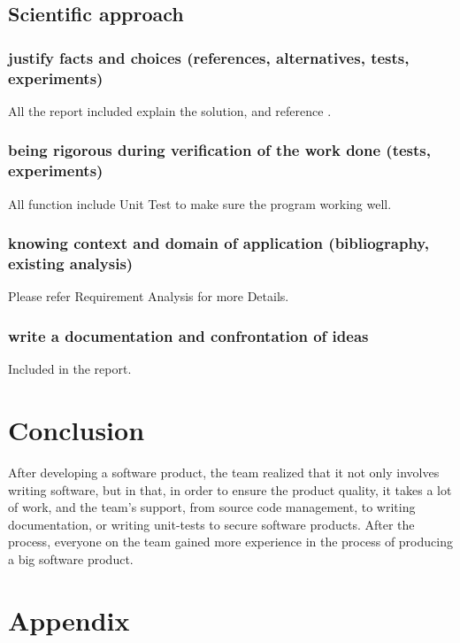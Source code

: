 \documentclass{article}
\begin{document}
\subsection{Scientific approach } 
\subsubsection{justify facts and choices (references, alternatives, tests, experiments)}
All the report included explain the solution, and reference .
\subsubsection{being rigorous during verification of the work done (tests, experiments)}
All function include Unit Test to make sure the program working well.
\subsubsection{knowing context and domain of application (bibliography, existing analysis)}
Please refer Requirement Analysis for more Details.
\subsubsection{write a documentation and confrontation of ideas}
Included in the report.

\section{Conclusion }
\qquad After developing a software product, the team realized that it not only involves writing software, but in that, in order to ensure the product quality, it takes a lot of work, and the team's support, from source code management, to writing documentation, or writing unit-tests to secure software products.
After the process, everyone on the team gained more experience in the process of producing a big software product.
\section{Appendix }
\end{document}
